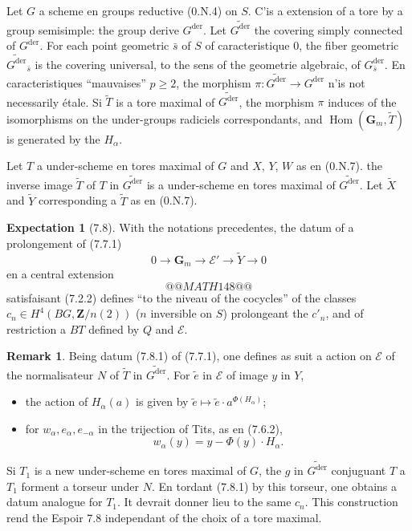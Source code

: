 \documentclass[11pt,a4paper]{article}
\theoremstyle{plain}
\theoremstyle{definition}
\newtheorem{remark}[theorem]{Remark}
\newtheorem{espoir}[theorem]{Expectation}
\DeclareMathOperator{\Hom}{Hom}
\DeclareMathOperator{\der}{der}
\begin{document}
\subsection{}\label{7.7}

Let $G$ a scheme en groups reductive (0.N.4) on $S$. C'is a extension of a tore by a group semisimple: the group derive $G^{\der}$. Let $\widetilde{G^{\der}}$ the covering simply connected of $G^{\der}$. For each point geometric $\bar{s}$ of $S$ of caracteristique 0, the fiber geometric $\widetilde{G^{\der}}_{\bar{s}}$ is the covering universal, to the sens of the geometrie algebraic, of $G^{\der}_{\bar{s}}$. En caracteristiques ``mauvaises'' $p \geq 2$, the morphism $\pi : \widetilde{G^{\der}} \to G^{\der}$ n'is not necessarily étale. Si $\widetilde{T}$ is a tore maximal of $\widetilde{G^{\der}}$, the morphism $\pi$ induces of the isomorphisms on the under-groups radiciels correspondants, and $\Hom(\mathbf{G}_m, \widetilde{T})$ is generated by the $H_\alpha$.

Let $T$ a under-scheme en tores maximal of $G$ and $X$, $Y$, $W$ as en (0.N.7). the inverse image $\widetilde{T}$ of $T$ in $\widetilde{G^{\der}}$ is a under-scheme en tores maximal of $\widetilde{G^{\der}}$. Let $\widetilde{X}$ and $\widetilde{Y}$ corresponding a $\widetilde{T}$ as en (0.N.7).

\begin{espoir}[7.8]\label{7.8}
With the notations precedentes, the datum of a prolongement of (7.7.1)
\begin{equation}\label{7.7.1}
0 \to \mathbf{G}_m \to \mathscr{E}' \to \widetilde{Y} \to 0
\end{equation}
en a central extension
\[
@@MATH148@@
\]
satisfaisant (7.2.2) defines ``to the niveau of the cocycles'' of the classes $c_n \in H^4(BG, \mathbf{Z}/n(2))$ ($n$ inversible on $S$) prolongeant the $c'_n$, and of restriction a $BT$ defined by $Q$ and $\mathscr{E}$.
\end{espoir}

\begin{remark}\label{7.9}
Being datum (7.8.1) of (7.7.1), one defines as suit a action on $\mathscr{E}$ of the normalisateur $N$ of $\widetilde{T}$ in $\widetilde{G^{\der}}$. For $\tilde{e}$ in $\mathscr{E}$ of image $y$ in $Y$,
\begin{itemize}
\item[a)] the action of $H_\alpha(a)$ is given by $\tilde{e} \mapsto \tilde{e} \cdot a^{\Phi(H_\alpha)}$;
\item[b)] for $w_\alpha, e_\alpha, e_{-\alpha}$ in the trijection of Tits, as en (7.6.2),
\[
w_\alpha(y) = y - \Phi(y) \cdot H_\alpha.
\]
\end{itemize}
Si $T_1$ is a new under-scheme en tores maximal of $G$, the $g$ in $\widetilde{G^{\der}}$ conjuguant $T$ a $T_1$ forment a torseur under $N$. En tordant (7.8.1) by this torseur, one obtains a datum analogue for $T_1$. It devrait donner lieu to the same $c_n$. This construction rend the Espoir 7.8 independant of the choix of a tore maximal.
\end{remark}
\end{document}
